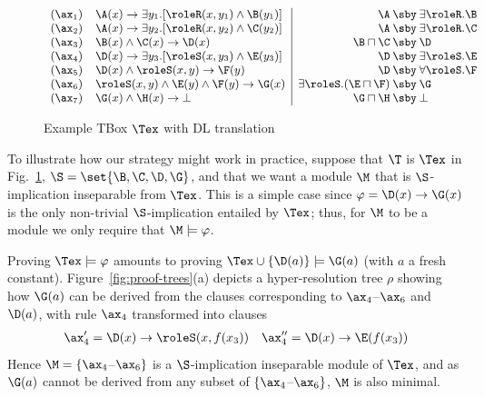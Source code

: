 \begin{figure}
\[
{\small
\begin{array}{rl|r@{\:\sby\:}l}
(\ax_1) 	& \A(x) \rightarrow \exists y_1. [\roleR(x,y_1) \wedge \B(y_1)] 		& \A&\exists \roleR. \B \\
(\ax_2) 	& \A(x) \rightarrow \exists y_2. [\roleR(x,y_2) \wedge \C(y_2)] 		& \A&\exists \roleR. \C \\
(\ax_3) 	& \B(x)\wedge\C(x) \rightarrow \D(x) 											& \B\sqcap\C&\D \\
(\ax_4) 	& \D(x) \rightarrow \exists y_3. [\roleS(x,y_3) \wedge \E(y_3)] 		& \D&\exists \roleS. \E \\
(\ax_5) 	& \D(x) \wedge \roleS(x,y) \rightarrow \F(y) 									& \D&\forall \roleS. \F \\
(\ax_6) 	& \roleS(x,y) \wedge \E(y) \wedge \F(y) \rightarrow \G(x) 				& \exists \roleS. (\E\sqcap\F)&\G \\
(\ax_7) 	& \G(x) \wedge \H(x) \rightarrow \bot		& \G \sqcap \H& \bot 
\end{array}}\]
\caption{Example TBox $\Tex$ with DL translation}
\label{fig:exampleTBox}
\end{figure}




To illustrate how our strategy might work in practice, 
suppose that $\T$ is $\Tex$
in Fig.\ \ref{fig:exampleTBox}, 
$\S =\set{\B,\C,\D,\G}$, and that
we want a module $\M$  that
is $\S$-implication inseparable from $\Tex$. This is a
 simple case 
since $\varphi=\D(x)\to\G(x)$ is
the only non-trivial $\S$-implication
entailed
by $\Tex$; thus, for $\M$ to be a module
we only require that $\M \models \varphi$.

Proving $\Tex \models \varphi$ 
amounts to proving $\Tex \cup \{\D(a)\} \models \G(a)$ (with $a$ a fresh constant).
Figure~\ref{fig:proof-trees}(a) depicts a hyper-resolution tree 
$\rho$ showing how $\G(a)$ can be derived
from the clauses corresponding to $\ax_4$--$\ax_6$ and $\D(a)$, with
rule $\ax_4$ transformed into clauses
%
\begin{align*}
\ax_4' = \D(x) \to \roleS(x,f(x_3)) & &  \ax_4'' = \D(x) \to \E(f(x_3))
\end{align*}
%
Hence $\M = \{\ax_4$--$\ax_6\}$ is a $\S$-implication 
inseparable module of $\Tex$, and as 
$\G(a)$ cannot be derived
from any subset of $\{\ax_4$--$\ax_6\}$, $\M$ is also minimal.

